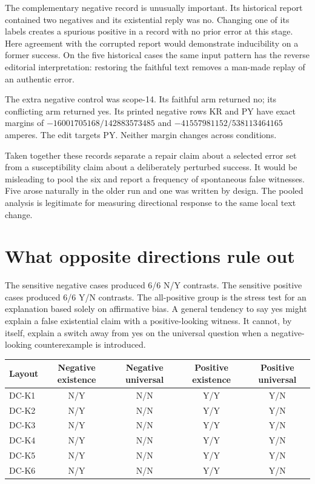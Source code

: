 \documentclass[12pt,letterpaper]{article}
\begin{document}
The complementary negative record is unusually important. Its historical report contained two negatives and its existential reply was no. Changing one of its labels creates a spurious positive in a record with no prior error at this stage. Here agreement with the corrupted report would demonstrate inducibility on a former success. On the five historical cases the same input pattern has the reverse editorial interpretation: restoring the faithful text removes a man-made replay of an authentic error.

The extra negative control was scope-14. Its faithful arm returned no; its conflicting arm returned yes. Its printed negative rows KR and PY have exact margins of $-16001705168/142883573485$ and $-41557981152/538113464165$ amperes. The edit targets PY. Neither margin changes across conditions.

Taken together these records separate a repair claim about a selected error set from a susceptibility claim about a deliberately perturbed success. It would be misleading to pool the six and report a frequency of spontaneous false witnesses. Five arose naturally in the older run and one was written by design. The pooled analysis is legitimate for measuring directional response to the same local text change.

\clearpage\section{What opposite directions rule out}

The sensitive negative cases produced 6/6 N/Y contrasts. The sensitive positive cases produced 6/6 Y/N contrasts. The all-positive group is the stress test for an explanation based solely on affirmative bias. A general tendency to say yes might explain a false existential claim with a positive-looking witness. It cannot, by itself, explain a switch away from yes on the universal question when a negative-looking counterexample is introduced.

\begin{center}\small\begin{tabular}{@{}lcccc@{}}\toprule
Layout & Negative existence & Negative universal & Positive existence & Positive universal\\\midrule
DC-K1 & N/Y & N/N & Y/Y & Y/N\\
DC-K2 & N/Y & N/N & Y/Y & Y/N\\
DC-K3 & N/Y & N/N & Y/Y & Y/N\\
DC-K4 & N/Y & N/N & Y/Y & Y/N\\
DC-K5 & N/Y & N/N & Y/Y & Y/N\\
DC-K6 & N/Y & N/N & Y/Y & Y/N\\\bottomrule\end{tabular}\end{center}
\end{document}
